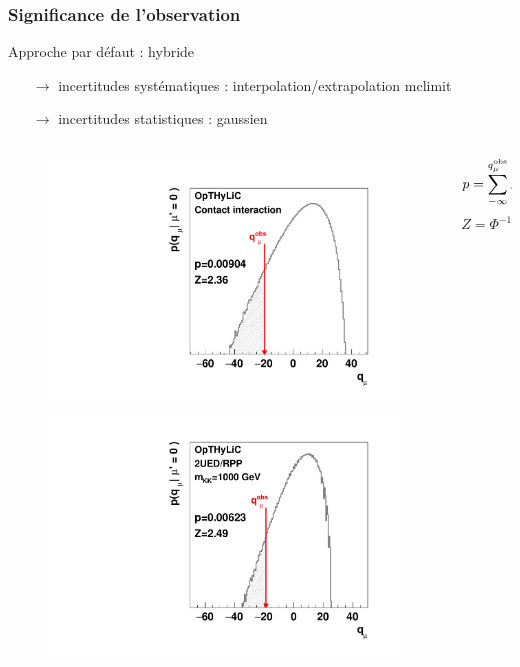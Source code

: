 \begin{frame}
\frametitle{Significance de l'observation}

\begin{small}
\begin{maliste}
\item Approche par d\'efaut : hybride
\begin{itemize}
\item[$\rightarrow$] incertitudes syst\'ematiques : interpolation/extrapolation mclimit
\item[$\rightarrow$] incertitudes statistiques :  gaussien
\end{itemize}
\end{maliste}
\end{small}

\vspace*{-0.42cm}
\begin{columns}
\begin{column}{0.5\textwidth}
\begin{figure}[!htb]
\begin{center}
\includegraphics[width=0.65\linewidth]{Figures/FourTops/significanceContactInteractionMcLimitNormal.pdf}\\
\includegraphics[width=0.65\linewidth]{Figures/FourTops/significance2UEDRPPMkk1000McLimitNormal.pdf}
\end{center}
\end{figure}
\end{column}
\begin{column}{0.5\textwidth}
\begin{varblock}[4cm]{}
\[p = \sum\limits_{-\infty}^{q_\mu^{\text{obs}}} P\left(q_\mu|\mu'=0\right)\]
\[Z=\Phi^{-1}\left(1-p\right)\]
\end{varblock}


\end{column}
\end{columns}
\end{frame}
